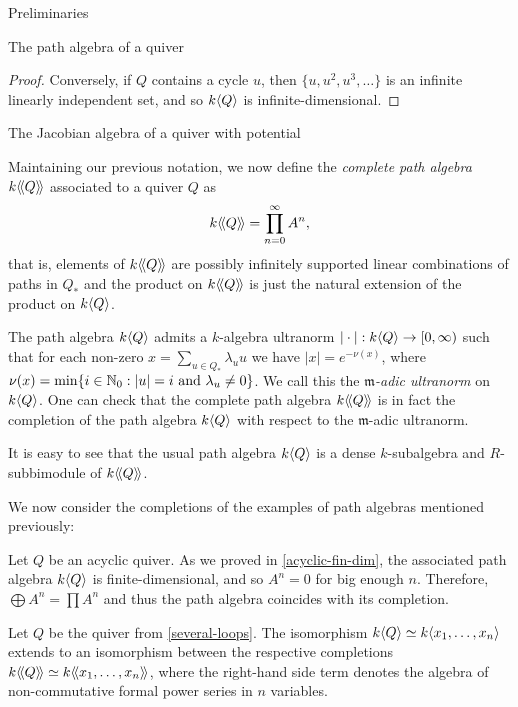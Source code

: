 \begin{chapter}{Preliminaries}
\begin{section}{The path algebra of a quiver}
\begin{proof}
Conversely, if $Q$ contains a cycle $u$, then $\{u,u^2,u^3,\dots\}$ is an infinite linearly independent set, and so $k\langle Q\rangle$ is infinite-dimensional.
\end{proof}

\begin{section}{The Jacobian algebra of a quiver with potential}


Maintaining our previous notation, we now define the \emph{complete path algebra} $k\langle\!\langle Q\rangle\!\rangle$ associated to a quiver $Q$ as
\[
k\langle\!\langle Q\rangle\!\rangle = \prod_{n=0}^\infty A^n,
\]
that is, elements of $k\langle\!\langle Q\rangle\!\rangle$ are possibly infinitely supported linear combinations of paths in $Q_*$ and the product on $k\langle\!\langle Q\rangle\!\rangle$ is just the natural extension of the product on $k\langle Q\rangle$.


The path algebra $k\langle Q\rangle$ admits a $k$-algebra ultranorm $\vert \cdot \vert: k\langle Q\rangle\to [0, \infty)$ such that for each non-zero $x=\sum_{u\in Q_*} \lambda_u u$ we have $\vert x\vert = e^{-\nu(x)}$, where $\nu(x) = \min\{ i\in \mathbb{N}_0 : |u| = i \text{ and } \lambda_u \neq 0 \}$. We call this the \emph{$\mathfrak{m}$-adic ultranorm} on $k\langle Q\rangle$. One can check that the complete path algebra $k\langle\!\langle Q\rangle\!\rangle$ is in fact the completion of the path algebra $k\langle Q\rangle$ with respect to the $\mathfrak{m}$-adic ultranorm.

It is easy to see that the usual path algebra $k\langle Q\rangle$ is a dense $k$-subalgebra and $R$-subbimodule of $k\langle\!\langle Q\rangle\!\rangle$.


We now consider the completions of the examples of path algebras mentioned previously:

\begin{exmp}Let $Q$ be an acyclic quiver. As we proved in \ref{acyclic-fin-dim}, the associated path algebra $k\langle Q\rangle$ is finite-dimensional, and so $A^n=0$ for big enough $n$. Therefore, $\bigoplus A^n=\prod A^n$ and thus the path algebra coincides with its completion.
\end{exmp}

\begin{exmp}Let $Q$ be the quiver from \ref{several-loops}. The isomorphism $k\langle Q\rangle\simeq k\langle x_1,\dots,x_n\rangle$ extends to an isomorphism between the respective completions $k\langle\!\langle Q\rangle\!\rangle\simeq k\langle\!\langle x_1,\dots,x_n\rangle\!\rangle$, where the right-hand side term denotes the algebra of non-commutative formal power series in $n$ variables.
\end{exmp}
\end{section}


\end{section}
\end{chapter}
